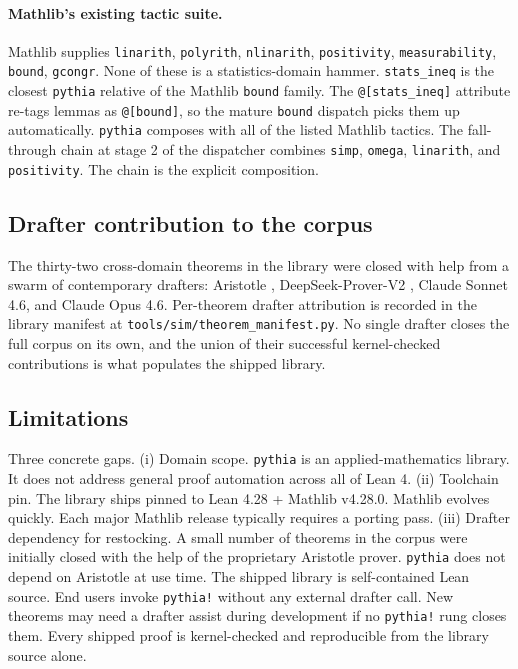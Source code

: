 \paragraph{Mathlib's existing tactic suite.}
Mathlib supplies \texttt{linarith}, \texttt{polyrith},
\texttt{nlinarith}, \texttt{positivity}, \texttt{measurability},
\texttt{bound}, \texttt{gcongr}. None of these is a statistics-domain
hammer. \texttt{stats\_ineq} is the closest \texttt{pythia} relative
of the Mathlib \texttt{bound} family. The \texttt{@[stats\_ineq]}
attribute re-tags lemmas as \texttt{@[bound]}, so the mature
\texttt{bound} dispatch picks them up automatically. \texttt{pythia} composes with all of the listed
Mathlib tactics. The fall-through chain at stage 2 of the dispatcher
combines \texttt{simp}, \texttt{omega}, \texttt{linarith}, and
\texttt{positivity}. The chain is the explicit composition.

\subsection{Drafter contribution to the corpus}
\label{sec:discussion-drafter-contribution}

The thirty-two cross-domain theorems in the library were closed
with help from a swarm of contemporary drafters: Aristotle
\citep{harmonic2025aristotle},
DeepSeek-Prover-V2 \citep{deepseekprover2024v2}, Claude Sonnet
4.6, and Claude Opus 4.6. Per-theorem drafter attribution is
recorded in the library manifest at
\texttt{tools/sim/theorem\_manifest.py}. No single drafter
closes the full corpus on its own, and the union of their
successful kernel-checked contributions is what populates the
shipped library.

\subsection{Limitations}
\label{sec:discussion-limitations}

Three concrete gaps. (i) Domain scope. \texttt{pythia} is an
applied-mathematics library. It does not address general proof
automation across all of Lean 4. (ii) Toolchain pin. The library
ships pinned to Lean 4.28 + Mathlib v4.28.0. Mathlib evolves
quickly. Each major Mathlib release typically requires a
porting pass. (iii) Drafter dependency for restocking. A small
number of theorems in the corpus were initially closed with the
help of the proprietary Aristotle prover. \texttt{pythia} does
not depend on Aristotle at use time. The shipped library is
self-contained Lean source. End users invoke \texttt{pythia!}
without any external drafter call. New theorems may need a
drafter assist during development if no \texttt{pythia!} rung
closes them. Every shipped proof is kernel-checked and
reproducible from the library source alone.
